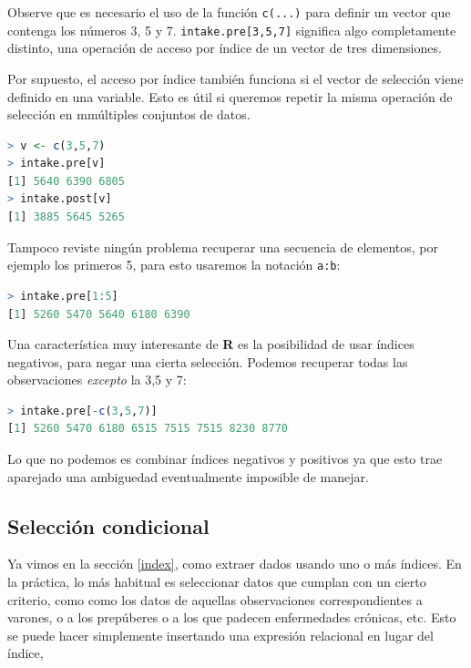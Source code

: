 \documentclass[spanish]{extbook}
\numberwithin{equation}{section}
\numberwithin{figure}{section}
\begin{document}
Observe que es necesario el uso de la función \texttt{c(...)} para definir un
vector que contenga los números 3, 5 y 7. \texttt{intake.pre[3,5,7]} significa
algo completamente distinto, una operación de acceso por índice de un vector de
tres dimensiones.

Por supuesto, el acceso por índice también funciona si el vector de selección
viene definido en una variable. Esto es útil si queremos repetir la misma
operación de selección en mmúltiples conjuntos de datos.

\begin{lstlisting}[language=R]
> v <- c(3,5,7)
> intake.pre[v]
[1] 5640 6390 6805
> intake.post[v]
[1] 3885 5645 5265
\end{lstlisting}

Tampoco reviste ningún problema recuperar una secuencia de elementos, por
ejemplo los primeros 5, para esto usaremos la notación \texttt{a:b}:

\begin{lstlisting}[language=R]
> intake.pre[1:5]
[1] 5260 5470 5640 6180 6390
\end{lstlisting}


Una característica muy interesante de \textbf{R} es la posibilidad de usar
índices negativos, para negar una cierta selección. Podemos recuperar todas
las observaciones \textit{excepto} la 3,5 y 7:

\begin{lstlisting}[language=R]
> intake.pre[-c(3,5,7)]
[1] 5260 5470 6180 6515 7515 7515 8230 8770
\end{lstlisting}

Lo que no podemos es combinar índices negativos y positivos ya que esto trae
aparejado una ambiguedad eventualmente imposible de manejar.

\subsection{Selección condicional}

Ya vimos en la sección \ref{index}, como extraer dados usando uno o más
índices. En la práctica, lo más habitual es seleccionar datos que cumplan con
un cierto criterio, como como los datos de aquellas observaciones
correspondientes a varones, o a los prepúberes o a los que padecen enfermedades
crónicas, etc. Esto se puede hacer simplemente insertando una expresión
relacional en lugar del índice,
\end{document}
